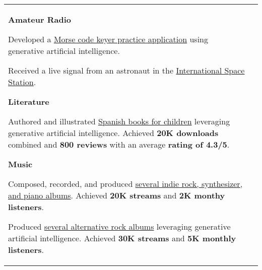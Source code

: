\documentclass[letterpaper,10pt,oneside]{article}
\newcommand{\itemspacingtwo}{\vspace{0.04cm}}
\newenvironment{body}
{\par\par
\begin{longtable}{p{0.145\textwidth}p{0.81\textwidth}}}
{\par\end{longtable}\par}
\begin{document}
\begin{body}
\textbf{Amateur Radio}
\begin{comp}
\item Developed a \href{https://lquesada.github.io/MorsePractice/}{Morse code keyer practice application} using generative artificial intelligence.
\item Received a live signal from an astronaut in the \href{https://www.youtube.com/watch?v=tkVmO62aYzk}{International Space Station}.
\end{comp}
\itemspacingtwo

\textbf{Literature}
\begin{comp}
\item Authored and illustrated \href{https://www.amazon.es/dp/B0C4DVR9N5}{Spanish books for children} leveraging generative artificial intelligence.
  \newline Achieved \textbf{20K downloads} combined and \textbf{800 reviews} with an average \textbf{rating of 4.3/5}.
\end{comp}
\itemspacingtwo

\textbf{Music}
\begin{comp}
\item Composed, recorded, and produced \href{https://open.spotify.com/artist/3RPEdOJGGdk3kOnmVq3dgX}{several indie rock, synthesizer, and piano albums}.
  \newline Achieved \textbf{20K streams} and \textbf{2K monthy listeners}.
\item Produced \href{https://open.spotify.com/artist/6GdiI8ZKeWhSY73WWOhbep}{several alternative rock albums} leveraging generative artificial intelligence.
  \newline Achieved \textbf{30K streams} and \textbf{5K monthly listeners}.
\end{comp}

\end{body}
\end{document}
